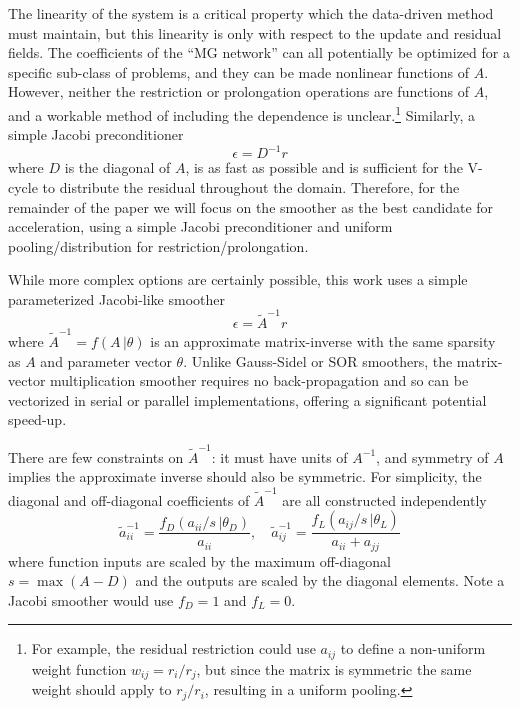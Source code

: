 \documentclass[review]{elsarticle}
\begin{document}
The linearity of the system is a critical property which the data-driven method must maintain, but this linearity is only with respect to the update and residual fields. The coefficients of the ``MG network'' can all potentially be optimized for a specific sub-class of problems, and they can be made nonlinear functions of $A$. However, neither the restriction or prolongation operations are functions of $A$, and a workable method of including the dependence is unclear.\footnote{For example, the residual restriction could use $a_{ij}$ to define a non-uniform weight function $w_{ij} = r_i/r_j$, but since the matrix is symmetric the same weight should apply to $r_j/r_i$, resulting in a uniform pooling.} Similarly, a simple Jacobi preconditioner
\begin{equation}
    \epsilon = D^{-1}r
\end{equation}
where $D$ is the diagonal of $A$, is as fast as possible and is sufficient for the V-cycle to distribute the residual throughout the domain. Therefore, for the remainder of the paper we will focus on the smoother as the best candidate for acceleration, using a simple Jacobi preconditioner and uniform pooling/distribution for restriction/prolongation.

While more complex options are certainly possible, this work uses a simple parameterized Jacobi-like smoother
\begin{equation}
    \epsilon = \tilde A^{-1}r
\end{equation}
where $\tilde A^{-1}=f(A\,|\theta)$ is an approximate matrix-inverse with the same sparsity as $A$ and parameter vector $\theta$. 
Unlike Gauss-Sidel or SOR smoothers, the matrix-vector multiplication smoother requires no back-propagation and so can be vectorized in serial or parallel implementations, offering a significant potential speed-up.

There are few constraints on $\tilde A^{-1}$: it must have units of $A^{-1}$, and symmetry of $A$ implies the approximate inverse should also be symmetric. For simplicity, the diagonal and off-diagonal coefficients of $\tilde A^{-1}$ are all constructed independently
\begin{equation}
    \tilde a^{-1}_{ii} = \frac{f_D(a_{ii}/s\,|\theta_D)}{a_{ii}} , \quad
    \tilde a^{-1}_{ij} = \frac{f_L(a_{ij}/s\,|\theta_L)}{a_{ii}+a_{jj}}
\end{equation}
where function inputs are scaled by the maximum off-diagonal $s=\max(A-D)$ and the outputs are scaled by the diagonal elements. Note a Jacobi smoother would use $f_D=1$ and $f_L=0$. 
\end{document}
